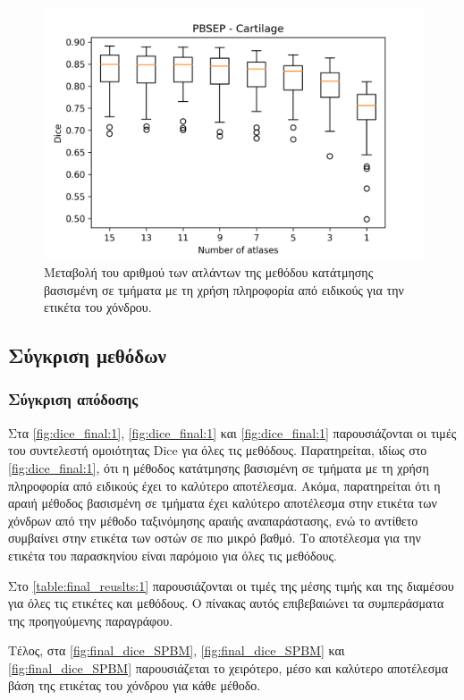 \documentclass[a4paper,12pt]{article}
\begin{document}
\begin{figure}[H]
    \centering
    \includegraphics[width=0.85\linewidth]{PBSEP_Number_of_atlases_Cartilage_plot.png}
    \caption{Μεταβολή του αριθμού των ατλάντων της μεθόδου κατάτμησης βασισμένη
             σε τμήματα με τη χρήση πληροφορία από ειδικούς για την ετικέτα του
             χόνδρου.}
    \label{fig:PBSEP:atlases:3}
\end{figure}


\subsection{Σύγκριση μεθόδων}

\subsubsection{Σύγκριση απόδοσης}

Στα \autoref{fig:dice_final:1}, \autoref{fig:dice_final:1} και
\autoref{fig:dice_final:1} παρουσιάζονται οι τιμές του συντελεστή ομοιότητας
Dice για όλες τις μεθόδους. Παρατηρείται, ιδίως στο \autoref{fig:dice_final:1},
ότι η μέθοδος κατάτμησης βασισμένη σε τμήματα με τη χρήση πληροφορία από
ειδικούς έχει το καλύτερο αποτέλεσμα. Ακόμα, παρατηρείται ότι η αραιή μέθοδος
βασισμένη σε τμήματα έχει καλύτερο αποτέλεσμα στην ετικέτα των χόνδρων από την
μέθοδο ταξινόμησης αραιής αναπαράστασης, ενώ το αντίθετο συμβαίνει στην ετικέτα
των οστών σε πιο μικρό βαθμό. Το αποτέλεσμα για την ετικέτα του παρασκηνίου
είναι παρόμοιο για όλες τις μεθόδους. 

Στο \autoref{table:final_reuslts:1} παρουσιάζονται οι τιμές της μέσης τιμής και
της διαμέσου για όλες τις ετικέτες και μεθόδους. Ο πίνακας αυτός επιβεβαιώνει τα
συμπεράσματα της προηγούμενης παραγράφου.

Τέλος, στα \autoref{fig:final_dice_SPBM}, \autoref{fig:final_dice_SPBM}
και \autoref{fig:final_dice_SPBM} παρουσιάζεται το χειρότερο, μέσο και καλύτερο
αποτέλεσμα βάση της ετικέτας του χόνδρου για κάθε μέθοδο.
\end{document}
